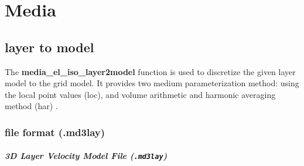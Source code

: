 \chapter{Media}\label{chapter-media}

\section{layer to model}
The \textbf{media\_el\_iso\_layer2model} function is used to discretize the given layer model to the grid model. It provides two medium parameterization method: using the local point values (loc), and volume arithmetic and harmonic averaging method (har) \citep{moczo_3d_2002,moczo_finite-difference_2014}.

\subsection{file format (.md3lay)}

\paragraph{3D Layer Velocity Model File (\texttt{.md3lay})\\}~

